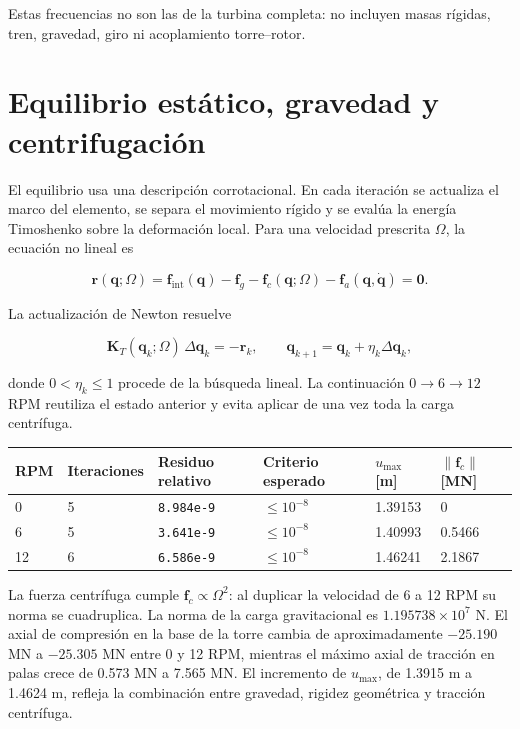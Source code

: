 \documentclass[oneside,a4paper,spanish,links]{amca}
\begin{document}
Estas frecuencias no son las de la turbina completa: no incluyen masas rígidas, tren, gravedad, giro ni acoplamiento torre--rotor.

\section{Equilibrio estático, gravedad y centrifugación}

El equilibrio usa una descripción corrotacional. En cada iteración se actualiza el marco del elemento, se separa el movimiento rígido y se evalúa la energía Timoshenko sobre la deformación local. Para una velocidad prescrita $\Omega$, la ecuación no lineal es

\[
\bm r(\bm q;\Omega)
=\bm f_{\mathrm{int}}(\bm q)
-\bm f_g
-\bm f_c(\bm q;\Omega)
-\bm f_a(\bm q,\dot{\bm q})
=\bm 0 .
\]

La actualización de Newton resuelve

\[
\bm K_T(\bm q_k;\Omega)\,\Delta\bm q_k=-\bm r_k,
\qquad
\bm q_{k+1}=\bm q_k+\eta_k\Delta\bm q_k,
\]

donde $0<\eta_k\leq1$ procede de la búsqueda lineal. La continuación $0\rightarrow6\rightarrow12$ RPM reutiliza el estado anterior y evita aplicar de una vez toda la carga centrífuga.

\begingroup
\scriptsize
\renewcommand{\arraystretch}{1.16}
\begin{center}
\begin{tabularx}{\textwidth}{@{}YYYYYY@{}}
\toprule
\textbf{RPM} & \textbf{Iteraciones} & \textbf{Residuo relativo} & \textbf{Criterio esperado} & \textbf{$u_{\max}$ [m]} & \textbf{$\lVert\bm f_c\rVert$ [MN]} \\
 & 5 & \texttt{8.984e-9}\allowbreak{} & $\leq10^{-8}$ & 1.39153 & 0 \\
6 & 5 & \texttt{3.641e-9}\allowbreak{} & $\leq10^{-8}$ & 1.40993 & 0.5466 \\
12 & 6 & \texttt{6.586e-9}\allowbreak{} & $\leq10^{-8}$ & 1.46241 & 2.1867 \\
\bottomrule
\end{tabularx}
\end{center}
\endgroup

La fuerza centrífuga cumple $\bm f_c\propto\Omega^2$: al duplicar la velocidad de 6 a 12 RPM su norma se cuadruplica. La norma de la carga gravitacional es $1.195738\times10^7$ N. El axial de compresión en la base de la torre cambia de aproximadamente $-25.190$ MN a $-25.305$ MN entre 0 y 12 RPM, mientras el máximo axial de tracción en palas crece de 0.573 MN a 7.565 MN. El incremento de $u_{\max}$, de 1.3915 m a 1.4624 m, refleja la combinación entre gravedad, rigidez geométrica y tracción centrífuga.
\end{document}
